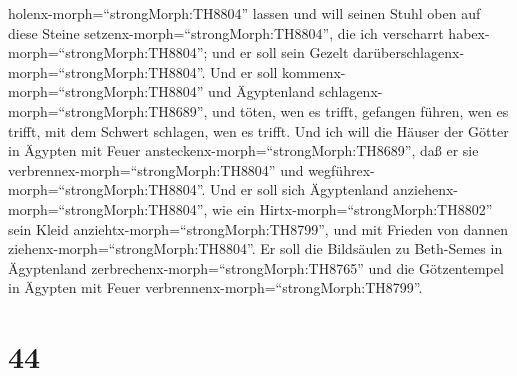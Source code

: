 holenx-morph=``strongMorph:TH8804'' lassen und will seinen Stuhl oben
auf diese Steine setzenx-morph=``strongMorph:TH8804'', die ich
verscharrt habex-morph=``strongMorph:TH8804''; und er soll sein Gezelt
darüberschlagenx-morph=``strongMorph:TH8804''.  Und er soll
kommenx-morph=``strongMorph:TH8804'' und Ägyptenland
schlagenx-morph=``strongMorph:TH8689'', und töten, wen es trifft,
gefangen führen, wen es trifft, mit dem Schwert schlagen, wen es trifft.
 Und ich will die Häuser der Götter in Ägypten mit Feuer
ansteckenx-morph=``strongMorph:TH8689'', daß er sie
verbrennex-morph=``strongMorph:TH8804'' und
wegführex-morph=``strongMorph:TH8804''. Und er soll sich Ägyptenland
anziehenx-morph=``strongMorph:TH8804'', wie ein
Hirtx-morph=``strongMorph:TH8802'' sein Kleid
anziehtx-morph=``strongMorph:TH8799'', und mit Frieden von dannen
ziehenx-morph=``strongMorph:TH8804''.  Er soll die
Bildsäulen zu Beth-Semes in Ägyptenland
zerbrechenx-morph=``strongMorph:TH8765'' und die Götzentempel in Ägypten
mit Feuer verbrennenx-morph=``strongMorph:TH8799''.

\hypertarget{section-43}{%
\section{44}\label{section-43}}


